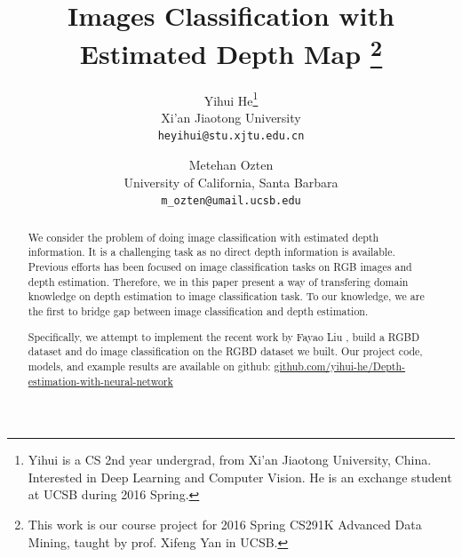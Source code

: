 \documentclass[10pt,twocolumn,letterpaper]{article}
\begin{document}
\title{Images Classification with Estimated Depth Map
\thanks{This work is our course project for 2016 Spring CS291K Advanced Data Mining, taught by prof. Xifeng Yan in UCSB.}}
\author{Yihui He\thanks{Yihui is a CS 2nd year undergrad, 
from Xi'an Jiaotong University, China. 
Interested in Deep Learning and Computer Vision. 
He is an exchange student at UCSB during 2016 Spring.}\\
Xi'an Jiaotong University\\
{\tt\small heyihui@stu.xjtu.edu.cn}
\and
Metehan Ozten\\
University of California, Santa Barbara\\
{\tt\small m\_ozten@umail.ucsb.edu}
}


\maketitle

\begin{abstract}
We consider the problem of doing image classification with estimated depth 
information. It is a challenging task as no direct depth information is 
available. Previous efforts has been focused on image classification tasks on 
RGB images and depth estimation. Therefore, we in this paper present a way of 
transfering domain knowledge on depth estimation to image classification task. 
To our knowledge, we are the first to bridge gap between image classification 
and depth estimation.

Specifically, we attempt to implement the recent work by Fayao 
Liu \etal\cite{liu2015deep}, build a RGBD dataset and do image classification 
on the RGBD dataset we built.
Our project code, models, and example results are available on github: \href{
https://github.com/yihui-he/Depth-estimation-with-neural-network 
}{github.com/yihui-he/Depth-estimation-with-neural-network}
\end{abstract}

\end{document}

